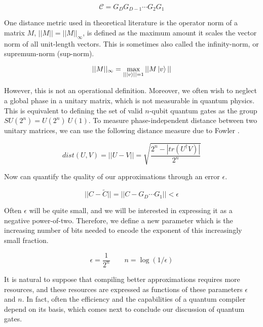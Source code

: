 \begin{equation}
\mathcal{C} = G_{D}G_{D-1}\cdots G_{2} G_{1}
\end{equation}

One distance metric used in theoretical literature
is the operator norm of a matrix $M$, $|| M || = || M ||_{\infty}$,
is defined as the maximum amount it scales the vector norm
of all unit-length vectors. This is sometimes also called the
infinity-norm, or supremum-norm (sup-norm).

\begin{equation}
|| M ||_{\infty} = \max_{|| \left\vert{v}\right\rangle || = 1} || M \left\vert{v}\right\rangle ||
\end{equation}

However, this is not an operational definition.
Moreover, we often wish to neglect a global phase in a unitary matrix,
which is not measurable in quantum physics. This is equivalent to
defining the set of valid $n$-qubit quantum gates as the
group $SU(2^n) = U(2^n) \ U(1)$. To measure phase-independent
distance between two unitary matrices, we can use the following
distance measure due to Fowler \cite{Fowler2011}.

\begin{equation}
dist(U, V) = ||U - V|| = \sqrt{\frac{2^n - |tr(U^{\dag}V)|}{2^n}}
\end{equation}

Now can quantify the quality of our approximations through an
error $\epsilon$.

\begin{equation}
|| C - \tilde{C} || = || C -  G_D\cdots G_1 || < \epsilon
\end{equation}

Often $\epsilon$ will be quite small, and we will be interested
in expressing it as a negative power-of-two. Therefore, we define a
new parameter which is the increasing number of bits needed to encode the exponent
of this increasingly small fraction.

\begin{equation}
\epsilon = \frac{1}{2^n} \qquad
n = \log(1/\epsilon)
\end{equation}

It is natural to suppose that compiling better approximations requires
more resources, and these resources are expressed as functions of these
parameters $\epsilon$ and $n$. In fact, often the efficiency and the
capabilities of a quantum
compiler depend on its basis, which comes next to conclude our discussion
of quantum gates.

